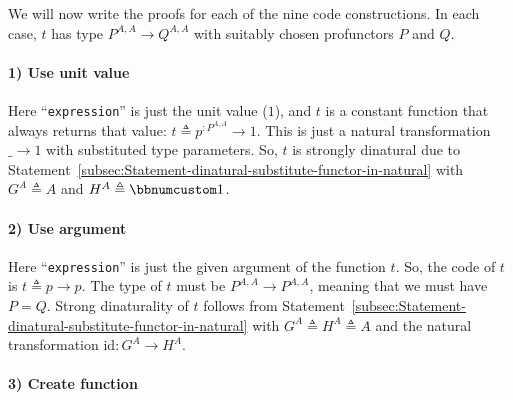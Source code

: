We will now write the proofs for each of the nine code constructions.
In each case, $t$ has type $P^{A,A}\rightarrow Q^{A,A}$ with suitably
chosen profunctors $P$ and $Q$.

\paragraph{1) Use unit value}

Here \textsf{``}\lstinline!expression!\textsf{''} is just the unit value ($1$),
and $t$ is a constant function that always returns that value: $t\triangleq p^{:P^{A,A}}\rightarrow1$.
This is just a natural transformation $\_\rightarrow1$ with substituted
type parameters. So, $t$ is strongly dinatural due to Statement~\ref{subsec:Statement-dinatural-substitute-functor-in-natural}
with $G^{A}\triangleq A$ and $H^{A}\triangleq\bbnum 1$.

\paragraph{2) Use argument }

Here \textsf{``}\lstinline!expression!\textsf{''} is just the given argument of the
function $t$. So, the code of $t$ is $t\triangleq p\rightarrow p$.
The type of $t$ must be $P^{A,A}\rightarrow P^{A,A}$, meaning that
we must have $P=Q$. Strong dinaturality of $t$ follows from Statement~\ref{subsec:Statement-dinatural-substitute-functor-in-natural}
with $G^{A}\triangleq H^{A}\triangleq A$ and the natural transformation
$\text{id}:G^{A}\rightarrow H^{A}$.

\paragraph{3) Create function}

